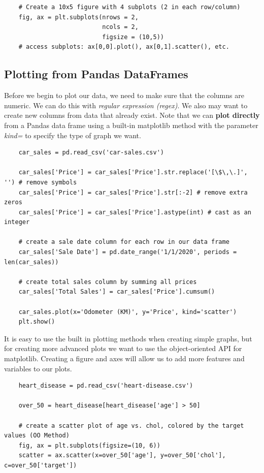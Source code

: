 \documentclass[11pt, a4paper]{article}
\begin{document}
\begin{spacing}{1.1}
\begin{lstlisting}
	# Create a 10x5 figure with 4 subplots (2 in each row/column)
	fig, ax = plt.subplots(nrows = 2,
	                       ncols = 2,
	                       figsize = (10,5))                                            
	# access subplots: ax[0,0].plot(), ax[0,1].scatter(), etc. \end{lstlisting} \vspace*{1mm}
	
	\subsection{Plotting from Pandas DataFrames}                                             
	Before we begin to plot our data, we need to make sure that the columns are numeric. We can do this with \textit{regular expression (regex)}. We also may want to create new columns from data that already exist. Note that we can \textbf{plot directly} from a Pandas data frame using a built-in matplotlib method with the parameter \textit{kind=} to specify the type of graph we want. 
	\begin{lstlisting}
	car_sales = pd.read_csv('car-sales.csv')
	
	car_sales['Price'] = car_sales['Price'].str.replace('[\$\,\.]', '') # remove symbols
	car_sales['Price'] = car_sales['Price'].str[:-2] # remove extra zeros
	car_sales['Price'] = car_sales['Price'].astype(int) # cast as an integer
	
	# create a sale date column for each row in our data frame
	car_sales['Sale Date'] = pd.date_range('1/1/2020', periods = len(car_sales))
	
	# create total sales column by summing all prices
	car_sales['Total Sales'] = car_sales['Price'].cumsum()	
	
	car_sales.plot(x='Odometer (KM)', y='Price', kind='scatter')
	plt.show() \end{lstlisting} \vspace*{1mm}
	It is easy to use the built in plotting methods when creating simple graphs, but for creating more advanced plots we want to use the object-oriented API for matplotlib. Creating a figure and axes will allow us to add more features and variables to our plots.
	\begin{lstlisting}
	heart_disease = pd.read_csv('heart-disease.csv') 
	
	over_50 = heart_disease[heart_disease['age'] > 50]
	
	# create a scatter plot of age vs. chol, colored by the target values (OO Method)
	fig, ax = plt.subplots(figsize=(10, 6))
	scatter = ax.scatter(x=over_50['age'], y=over_50['chol'], c=over_50['target'])	
	

\end{lstlisting}
\end{spacing}
\end{document}
